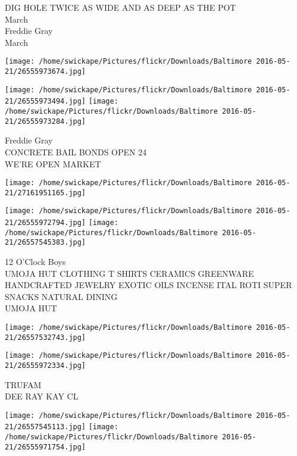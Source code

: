 \documentclass[10pt,letterpaper]{article}
\begin{document}
DIG HOLE TWICE AS WIDE AND AS DEEP AS THE POT\\
March\\
Freddie Gray\\
March\\
\pagebreak

\texttt{[image: /home/swickape/Pictures/flickr/Downloads/Baltimore 2016-05-21/26555973674.jpg]}

\vspace{0.25in}
\texttt{[image: /home/swickape/Pictures/flickr/Downloads/Baltimore 2016-05-21/26555973494.jpg]}
\texttt{[image: /home/swickape/Pictures/flickr/Downloads/Baltimore 2016-05-21/26555973284.jpg]}

Freddie Gray\\
CONCRETE BAIL BONDS OPEN 24\\
WE'RE OPEN MARKET\\
\pagebreak

\texttt{[image: /home/swickape/Pictures/flickr/Downloads/Baltimore 2016-05-21/27161951165.jpg]}

\vspace{0.25in}
\texttt{[image: /home/swickape/Pictures/flickr/Downloads/Baltimore 2016-05-21/26555972794.jpg]}
\texttt{[image: /home/swickape/Pictures/flickr/Downloads/Baltimore 2016-05-21/26557545383.jpg]}

12 O'Clock Boys\\
UMOJA HUT CLOTHING T SHIRTS CERAMICS GREENWARE HANDCRAFTED JEWELRY EXOTIC OILS INCENSE ITAL ROTI SUPER SNACKS NATURAL DINING\\
UMOJA HUT\\
\pagebreak

\texttt{[image: /home/swickape/Pictures/flickr/Downloads/Baltimore 2016-05-21/26557532743.jpg]}

\vspace{0.25in}
\texttt{[image: /home/swickape/Pictures/flickr/Downloads/Baltimore 2016-05-21/26555972334.jpg]}

TRUFAM\\
DEE RAY KAY CL\\
\pagebreak

\texttt{[image: /home/swickape/Pictures/flickr/Downloads/Baltimore 2016-05-21/26557545113.jpg]}
\texttt{[image: /home/swickape/Pictures/flickr/Downloads/Baltimore 2016-05-21/26555971754.jpg]}
\end{document}
